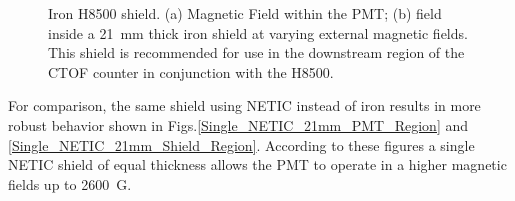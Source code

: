 \documentclass[12pt]{article}
\begin{document}
\begin{figure}[ht]
\centering
{}
\qquad
{}
\caption{\small{Iron H8500 shield. (a) Magnetic Field within the PMT; (b)
field inside  a 21~mm thick iron shield at varying external magnetic fields. 
This shield is recommended for use in the downstream region of the CTOF counter in 
conjunction with the H8500.}}\label{Upstream_Iron_21mm}
\end{figure}
%

For comparison, the same shield using NETIC instead of iron results in more robust
 behavior shown in Figs.\ref{Single_NETIC_21mm_PMT_Region}
 and \ref{Single_NETIC_21mm_Shield_Region}.
According to these figures  a single NETIC shield of equal thickness 
allows the PMT to operate in a higher magnetic fields up to  2600~G. 
\end{document}
